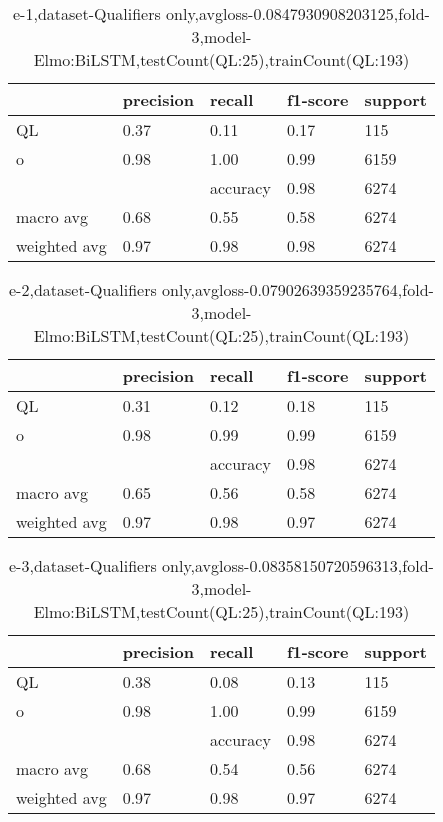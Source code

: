 \begin{table}[!ht] 
\centering
\caption{e-1,dataset-Qualifiers only,avgloss-0.0847930908203125,fold-3,model-Elmo:BiLSTM,testCount(QL:25),trainCount(QL:193)}\label{e-1data-qualS.tsv}
\begin{tabularx}{300pt}{|X|X|X|X|X|}
\hline
&precision&recall&f1-score&support\\
\hline
QL&0.37&0.11&0.17&115\\
\hline
o&0.98&1.00&0.99&6159\\
\hline
&&accuracy&0.98&6274\\
\hline
macro avg&0.68&0.55&0.58&6274\\
\hline
weighted avg&0.97&0.98&0.98&6274\\
\hline
\end{tabularx}
\end{table}
\begin{table}[!ht] 
\centering
\caption{e-2,dataset-Qualifiers only,avgloss-0.07902639359235764,fold-3,model-Elmo:BiLSTM,testCount(QL:25),trainCount(QL:193)}\label{e-2data-qualS.tsv}
\begin{tabularx}{300pt}{|X|X|X|X|X|}
\hline
&precision&recall&f1-score&support\\
\hline
QL&0.31&0.12&0.18&115\\
\hline
o&0.98&0.99&0.99&6159\\
\hline
&&accuracy&0.98&6274\\
\hline
macro avg&0.65&0.56&0.58&6274\\
\hline
weighted avg&0.97&0.98&0.97&6274\\
\hline
\end{tabularx}
\end{table}
\begin{table}[!ht] 
\centering
\caption{e-3,dataset-Qualifiers only,avgloss-0.08358150720596313,fold-3,model-Elmo:BiLSTM,testCount(QL:25),trainCount(QL:193)}\label{e-3data-qualS.tsv}
\begin{tabularx}{300pt}{|X|X|X|X|X|}
\hline
&precision&recall&f1-score&support\\
\hline
QL&0.38&0.08&0.13&115\\
\hline
o&0.98&1.00&0.99&6159\\
\hline
&&accuracy&0.98&6274\\
\hline
macro avg&0.68&0.54&0.56&6274\\
\hline
weighted avg&0.97&0.98&0.97&6274\\
\hline
\end{tabularx}
\end{table}
